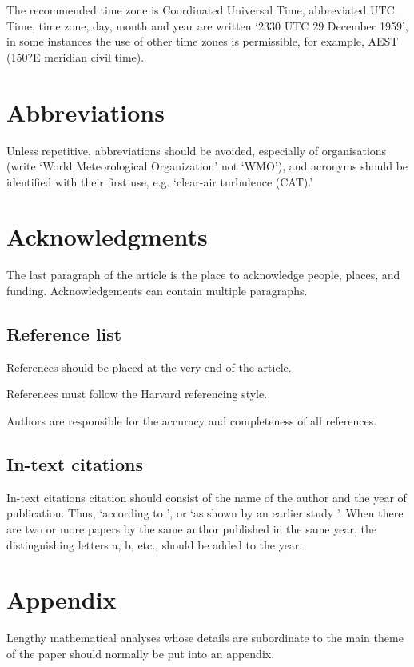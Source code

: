 \documentclass[10pt]{article}
\begin{document}
The recommended time zone is Coordinated Universal Time, abbreviated UTC. Time, time zone, day, month and year are written `2330 UTC 29 December 1959', in some instances the use of other time zones is permissible, for example, AEST (150?E meridian civil time).

\section{Abbreviations}
Unless repetitive, abbreviations should be avoided, especially of organisations (write `World Meteorological Organization' not `WMO'), and acronyms should be identified with their first use, e.g. `clear-air turbulence (CAT).'

\section{Acknowledgments}
\label{Acknowledgments}
The last paragraph of the article is the place to acknowledge people, places, and funding. Acknowledgements can contain multiple paragraphs.





\subsection{Reference list}
\label{ReferenceList}
References should be placed at the very end of the article.

References must follow the Harvard referencing style.

Authors are responsible for the accuracy and completeness of all references.

\subsection{In-text citations}
\label{IntextCitations}
In-text citations citation should consist of the name of the author and the year of publication. Thus, `according to \citet{David2013,Linden2009,Trewin2010}', or `as shown by an earlier study \cite{Budin1985}'. When there are two or more papers by the same author published in the same year, the distinguishing letters a, b, etc., should be added to the year.


\section{Appendix}
\label{Appendix}
Lengthy mathematical analyses whose details are subordinate to the main theme of the paper should normally be put into an appendix.
\end{document}
